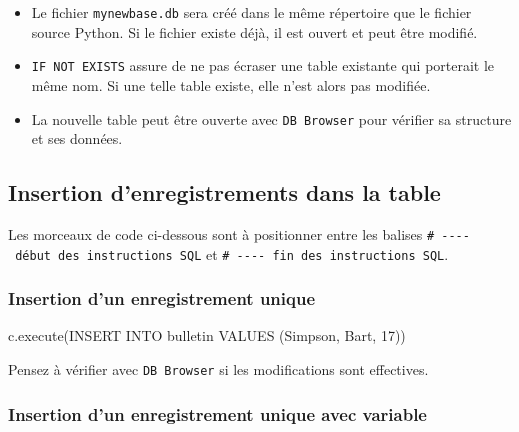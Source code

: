 \documentclass[
  a4paper,
  DIV=11,
  numbers=noendperiod]{scrartcl}
\newenvironment{Shaded}{\begin{snugshade}}{\end{snugshade}}
\newcommand{\NormalTok}[1]{\textcolor[rgb]{0.00,0.23,0.31}{#1}}
\newcommand{\StringTok}[1]{\textcolor[rgb]{0.13,0.47,0.30}{#1}}
\providecommand{\tightlist}{%
  \setlength{\itemsep}{0pt}\setlength{\parskip}{0pt}}\usepackage{longtable,booktabs,array}
\begin{document}
\begin{itemize}
\tightlist
\item
  Le fichier \texttt{mynewbase.db} sera créé dans le même répertoire que
  le fichier source Python. Si le fichier existe déjà, il est ouvert et
  peut être modifié.
\item
  \texttt{IF\ NOT\ EXISTS} assure de ne pas écraser une table existante
  qui porterait le même nom. Si une telle table existe, elle n'est alors
  pas modifiée.
\item
  La nouvelle table peut être ouverte avec \texttt{DB\ Browser} pour
  vérifier sa structure et ses données.
\end{itemize}

\hypertarget{insertion-denregistrements-dans-la-table}{%
\subsection{Insertion d'enregistrements dans la
table}\label{insertion-denregistrements-dans-la-table}}

Les morceaux de code ci-dessous sont à positionner entre les balises
\texttt{\#\ -\/-\/-\/-\ début\ des\ instructions\ SQL} et
\texttt{\#\ -\/-\/-\/-\ fin\ des\ instructions\ SQL}.

\hypertarget{insertion-dun-enregistrement-unique}{%
\subsubsection{Insertion d'un enregistrement
unique}\label{insertion-dun-enregistrement-unique}}

\begin{Shaded}
\begin{Highlighting}[]
\NormalTok{c.execute(}\StringTok{\textquotesingle{}\textquotesingle{}\textquotesingle{}INSERT INTO bulletin VALUES (\textquotesingle{}Simpson\textquotesingle{}, \textquotesingle{}Bart\textquotesingle{}, 17)\textquotesingle{}\textquotesingle{}\textquotesingle{}}\NormalTok{)}
\end{Highlighting}
\end{Shaded}

Pensez à vérifier avec \texttt{DB\ Browser} si les modifications sont
effectives.

\hypertarget{insertion-dun-enregistrement-unique-avec-variable}{%
\subsubsection{Insertion d'un enregistrement unique avec
variable}\label{insertion-dun-enregistrement-unique-avec-variable}}
\end{document}
